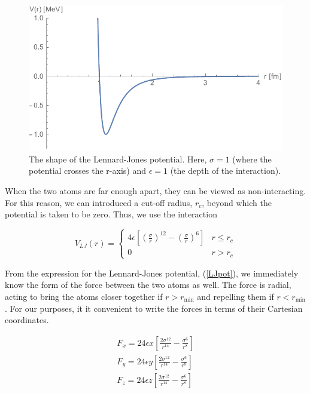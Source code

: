 \documentclass{article}
\begin{document}
\begin{multicols}{2}
\begin{figure}[H]
\begin{center}
\includegraphics[width=\linewidth]{plots/VLJ.pdf}
\caption{The shape of the Lennard-Jones potential.  Here, $\sigma=1$ (where the potential crosses the r-axis) and $\epsilon =1$ (the depth of the interaction).}
\label{VLJfig}
\end{center}
\end{figure}

When the two atoms are far enough apart, they can be viewed as non-interacting.  For this reason, we can introduced a cut-off radius, $r_c$, beyond which the potential is taken to be zero.  Thus, we use the interaction 

\begin{equation}
V_{LJ} (r) = \begin{cases}
4 \epsilon \left [ \left (\frac{\sigma}{r} \right )^{12} - \left (\frac{\sigma}{r} \right )^{6} \right ] & r \le r_c \\
0 & r > r_c
\end{cases}
\end{equation}

From the expression for the Lennard-Jones potential, (\ref{LJpot}), we immediately know the form of the force between the two atoms as well.  The force is radial, acting to bring the atoms closer together if $r > r_{\mathrm{min}}$ and repelling them if $r < r_{\mathrm{min}}$.  For our purposes, it it convenient to write the forces in terms of their Cartesian coordinates.  

\begin{equation}
\begin{split}
F_x = 24\epsilon x \left [ \frac{2 \sigma ^{12}}{r^{14}} - \frac{\sigma ^{6}}{r^8} \right ] \\
F_y = 24 \epsilon y \left [ \frac{2 \sigma ^{12}}{r^{14}} - \frac{\sigma ^{6}}{r^8} \right ] \\
F_z = 24 \epsilon z \left [ \frac{2 \sigma ^{12}}{r^{14}} - \frac{\sigma ^{6}}{r^8} \right ] \\
\end{split}
\end{equation}


\end{multicols}
\end{document}
